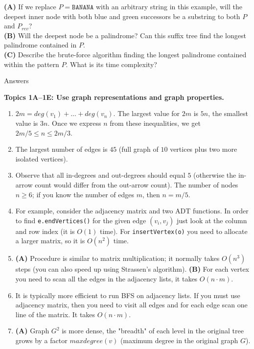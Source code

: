 \documentclass[a4paper,12pt]{article}
\begin{document}
{\begin{enumerate}[label=4.\Alph*.]
{\bf (A)} If we replace $P = \mathtt{BANANA}$ with an arbitrary string in this example, 
will the deepest inner node with both blue and green successors be a substring to both 
$P$ and $P_{rev}$?\\
{\bf (B)} Will the deepest node be a palindrome? Can this suffix tree find the longest
palindrome contained in $P$.\\
{\bf (C)} Describe the brute-force algorithm finding the longest palindrome contained within 
the pattern $P$. What is its time complexity?

\end{enumerate}


\clearpage

{\LARGE Answers}

{\bf Topics 1A--1E: Use graph representations and graph properties.} 

\begin{enumerate}
\item $2m = deg(v_1) + \ldots + deg(v_n)$. The largest value for $2m$ is $5n$, the smallest value is $3n$. 
Once we express $n$ from these inequalities, we get $2m/5 \leq n \leq 2m/3$. 
\item The largest number of edges is $45$ (full graph of $10$ vertices plus two more isolated vertices). 
\item Observe that all in-degrees and out-degrees should equal $5$ (otherwise the in-arrow count would 
differ from the out-arrow count). The number of nodes $n \geq 6$; if you know the number of edges $m$, 
then $n = m/5$. 
\item For example, consider the adjacency matrix and two ADT functions.
In order to find {\tt e.endVertices()} for the given edge $(v_i, v_j)$ 
just look at the column and row index (it is $O(1)$ time). 
For {\tt insertVertex(o)} you need to allocate a larger matrix, 
so it is $O(n^2)$ time.
\item {\bf (A)} Procedure is similar to matrix multiplication; 
it normally takes $O(n^3)$ steps (you can also speed up using 
Strassen's algorithm). {\bf (B)} For each vertex 
you need to scan all the edges in the adjacency lists, 
it takes $O(n \cdot m)$. 
\item It is typically more efficient to run BFS on adjacency lists. 
If you must use adjacency matrix, then you need to visit all edges
and for each edge scan one line of the matrix. 
It takes $O(n \cdot m)$. 
\item {\bf (A)} Graph $G^2$ is more dense, the "breadth" 
of each level in the original tree grows by a factor 
$maxdegree(v)$  (maximum degree in the original graph $G$). 
\end{enumerate}



}
\end{document}
